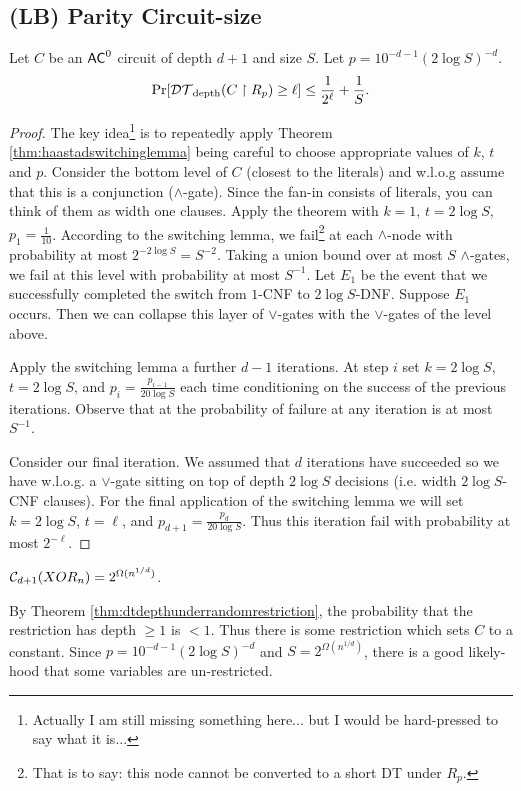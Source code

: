 \documentclass[11pt]{article}
\begin{document}
	\subsection{(LB) Parity Circuit-size}
	\begin{theorem}
		\label{thm:dtdepthunderrandomrestriction}
		Let $C$ be an $\mathsf{AC}^0$ circuit of depth $d + 1$ and size $S$. Let $p = 10^{-d - 1}(2\log S)^{-d}$.
		\[\Pr[\mathcal{DT}_{\mathrm{depth}}(C \upharpoonright R_p) \geq \ell] \leq \frac{1}{2^\ell} + \frac{1}{S}.\] 
	\end{theorem}
	\begin{proof}
		The key idea\footnote{Actually I am still missing something here... but I would be hard-pressed to say what it is...} is to repeatedly apply Theorem \ref{thm:haastadswitchinglemma} being careful to choose appropriate values of $k$, $t$ and $p$. Consider the bottom level of $C$ (closest to the literals) and w.l.o.g assume that this is a conjunction ($\land$-gate). Since the fan-in consists of literals, you can think of them as width one clauses. Apply the theorem with $k = 1$, $t = 2\log S$, $p_1 = \frac{1}{10}$. According to the switching lemma, we fail\footnote{That is to say: this node cannot be converted to a short DT under $R_p$.} at each $\land$-node with probability at most $2^{-2\log S} = S^{-2}$. Taking a union bound over at most $S$ $\land$-gates, we fail at this level with probability at most $S^{-1}$. Let $E_1$ be the event that we successfully completed the switch from $1$-CNF to $2\log S$-DNF. Suppose $E_1$ occurs. Then we can collapse this layer of $\lor$-gates with the $\lor$-gates of the level above. 
		
		Apply the switching lemma a further $d-1$ iterations. At step $i$ set $k = 2\log S$, $t = 2\log S$, and $p_{i} = \frac{p_{i-1}}{20\log S}$ each time conditioning on the success of the previous iterations. Observe that at the probability of failure at any iteration is at most $S^{-1}$.
		
		Consider our final iteration. We assumed that $d$ iterations have succeeded so we have w.l.o.g. a $\lor$-gate sitting on top of depth $2\log S$ decisions (i.e. width $2\log S$-CNF clauses). For the final application of the switching lemma we will set $k = 2\log S$, $t = \ell$, and $p_{d+1} = \frac{p_d}{20\log S}$. Thus this iteration fail with probability at most $2^{-\ell}$.
	\end{proof}
	
	\begin{corollary}
		$\mathcal{C}_{d+1}(XOR_n) = 2^{\Omega(n^{1/d})}$.
	\end{corollary}
	By Theorem \ref{thm:dtdepthunderrandomrestriction}, the probability that the restriction has depth $\geq 1$ is $< 1$. Thus there is some restriction which sets $C$ to a constant. Since $p = 10^{-d-1}(2\log S)^{-d}$ and $S = 2^{\Omega(n^{1/d})}$, there is a good likely-hood that some variables are un-restricted.
	
\end{document}
